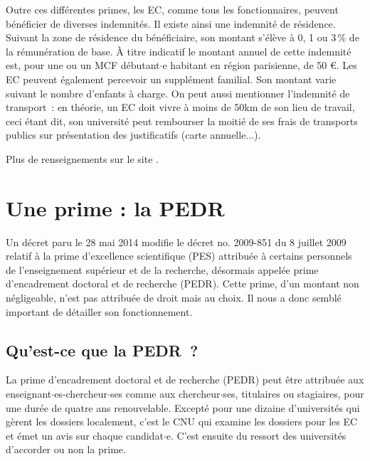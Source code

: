 Outre ces diff\'erentes primes, les EC, comme tous les
fonctionnaires, peuvent b\'en\'eficier de diverses indemnit\'es. Il
existe ainsi une indemnit\'e de r\'esidence. Suivant la zone de
r\'esidence du b\'en\'eficiaire, son montant s'\'el\`eve \`a 0, 1 ou
3\,\% de la r\'emun\'eration de base. \`A titre indicatif le montant
annuel de cette indemnit\'e est, pour une ou un MCF d\'ebutant$\cdot$e habitant en
r\'egion parisienne, de 50 \euro{}. Les EC peuvent \'egalement
percevoir un suppl\'ement familial. Son montant varie suivant le
nombre d'enfants \`a charge. 
On peut aussi mentionner l'indemnit\'e de transport~: 
en th\'eorie, un EC doit vivre \`a moins de 50km de son lieu de travail, 
ceci \'etant dit, son universit\'e peut rembourser la moiti\'e de ses frais de transports publics sur pr\'esentation des justificatifs (carte annuelle...).


Plus de renseignements sur le site 
.


\section{Une prime : la PEDR}
\label{pedr}

Un d\'ecret paru le 28 mai 2014 modifie le d\'ecret no. 2009-851 du 8 juillet 2009 relatif \`a la prime d'excellence scientifique (PES) 
attribu\'ee \`a certains personnels de l'enseignement sup\'erieur et de la recherche, 
d\'esormais appel\'ee prime d'encadrement doctoral et de recherche (PEDR). 
Cette prime, d'un montant non n\'egligeable, n'est pas
attribu\'ee de droit mais au choix. Il nous a donc sembl\'e important de d\'etailler son fonctionnement.
% 

\subsection{Qu'est-ce que la PEDR~?}

La prime d'encadrement doctoral et de recherche (PEDR) peut \^etre
attribu\'ee aux enseignant$\cdot$es-cher\-cheur$\cdot$ses comme aux chercheur$\cdot$ses, titulaires ou stagiaires, pour une dur\'ee de quatre
ans renouvelable. Except\'e pour une dizaine d'universit\'es qui g\`erent les dossiers localement, c'est le CNU qui examine les dossiers pour les EC et \'emet un avis sur chaque candidat$\cdot$e. C'est ensuite du ressort des universit\'es d'accorder ou non la prime.


